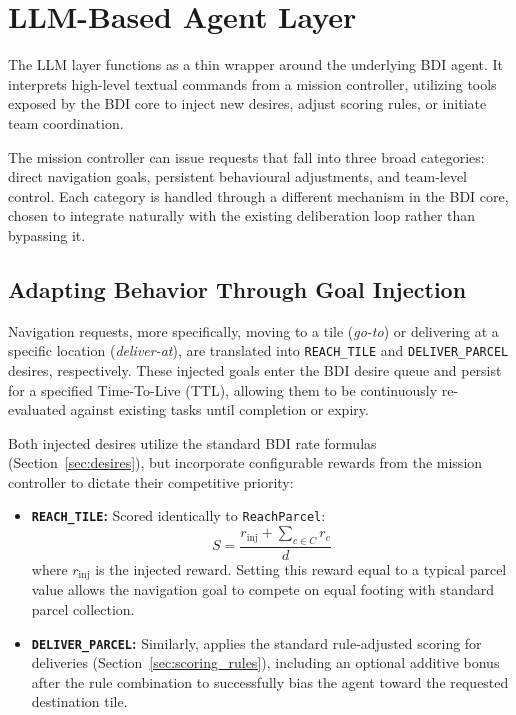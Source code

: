 \section{LLM-Based Agent Layer}
\label{sec:llm}
The LLM layer functions as a thin wrapper around the underlying BDI agent.
It interprets high-level textual commands from a mission controller, utilizing tools exposed by the BDI core to inject new desires,
adjust scoring rules, or initiate team coordination.

The mission controller can issue requests that fall into three broad categories: direct navigation goals, persistent behavioural adjustments, and team-level control.
Each category is handled through a different mechanism in the BDI core, chosen to integrate naturally with the existing deliberation loop rather than bypassing it.

\subsection{Adapting Behavior Through Goal Injection}

Navigation requests, more specifically, moving to a tile (\emph{go-to}) or delivering at a specific location (\emph{deliver-at}), are translated into \texttt{REACH\_TILE} and \texttt{DELIVER\_PARCEL} desires, respectively. 
These injected goals enter the BDI desire queue and persist for a specified Time-To-Live (TTL), allowing them to be continuously re-evaluated against existing tasks until completion or expiry.

Both injected desires utilize the standard BDI rate formulas (Section~\ref{sec:desires}), 
but incorporate configurable rewards from the mission controller to dictate their competitive priority:

\begin{itemize}
    \item \textbf{\texttt{REACH\_TILE}:} Scored identically to \texttt{ReachParcel}:
    \begin{equation*}
      S = \frac{r_{\text{inj}} + \sum_{c \in C} r_c}{d}
    \end{equation*}
    where $r_{\text{inj}}$ is the injected reward. Setting this reward equal to a typical parcel value allows the navigation goal to compete on equal footing with standard parcel collection.

    \item \textbf{\texttt{DELIVER\_PARCEL}:} Similarly, applies the standard rule-adjusted scoring for deliveries (Section~\ref{sec:scoring_rules}), including an optional additive bonus after the rule combination to successfully bias the agent toward the requested destination tile.
\end{itemize}

